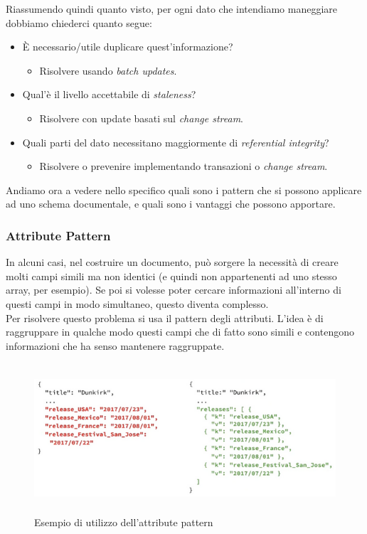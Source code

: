 \noindent Riassumendo quindi quanto visto, per ogni dato che intendiamo maneggiare dobbiamo chiederci quanto segue:
\begin{itemize}
    \item È necessario/utile duplicare quest'informazione?
    \begin{itemize}
        \item Risolvere usando \textit{batch updates}.
    \end{itemize}
    \item Qual'è il livello accettabile di \textit{staleness}?
    \begin{itemize}
        \item Risolvere con update basati sul \textit{\gls{change stream}}.
    \end{itemize}
    \item Quali parti del dato necessitano maggiormente di \textit{referential integrity}?
    \begin{itemize}
        \item Risolvere o prevenire implementando transazioni o \textit{\gls{change stream}}.
    \end{itemize}
\end{itemize}

\noindent Andiamo ora a vedere nello specifico quali sono i pattern che si possono applicare ad uno schema documentale, e quali sono i vantaggi che possono apportare.

\subsubsection{Attribute Pattern}
In alcuni casi, nel costruire un documento, può sorgere la necessità di creare molti campi simili ma non identici (e quindi non appartenenti ad uno stesso array, per esempio). Se poi si volesse poter cercare informazioni all'interno di questi campi in modo simultaneo, questo diventa complesso.\\
Per risolvere questo problema si usa il pattern degli attributi. L'idea è di raggruppare in qualche modo questi campi che di fatto sono simili e contengono informazioni che ha senso mantenere raggruppate.\\

\begin{figure}[htbp]
\begin{center}
\includegraphics[height=15em]{immagini/attribute-pattern.png}
\caption{Esempio di utilizzo dell'attribute pattern}
\end{center}
\end{figure}

